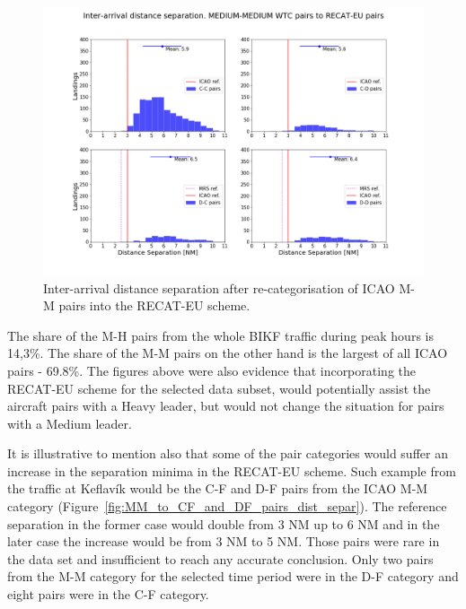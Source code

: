 \begin{figure}[h]
    \centering
    \includegraphics[width=1.0\textwidth]{graphics/fig_MM_to_RECAT_pairs_dist_separ.png}
    \caption[Inter-arrival distance separation of ICAO M-M pairs into the RECAT-EU scheme]{Inter-arrival distance separation after re-categorisation of ICAO M-M pairs into the RECAT-EU scheme.}
    \label{fig:MM_to_RECAT_pairs_dist_separ}
\end{figure}

The share of the M-H pairs from the whole BIKF traffic during peak hours is 14,3\%. The share of the M-M pairs on the other hand is the largest of all ICAO pairs - 69.8\%. The figures above were also evidence that incorporating the RECAT-EU scheme for the selected data subset, would potentially assist the aircraft pairs with a Heavy leader, but would not change the situation for pairs with a Medium leader. 

It is illustrative to mention also that some of the pair categories would suffer an increase in the separation minima in the RECAT-EU scheme. Such example from the traffic at Keflavík would be the C-F and D-F pairs from the ICAO M-M category (Figure~\ref{fig:MM_to_CF_and_DF_pairs_dist_separ}). The reference separation in the former case would double from 3 NM up to 6 NM and in the later case the increase would be from 3 NM to 5 NM. Those pairs were rare in the data set and insufficient to reach any accurate conclusion. Only two pairs from the M-M category for the selected time period were in the D-F category and eight pairs were in the C-F category.


